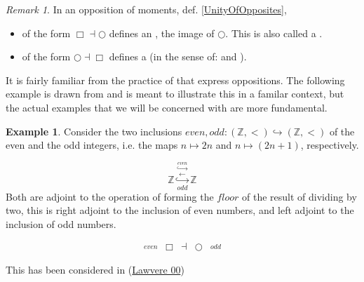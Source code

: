 \documentclass[12pt,titlepage]{article}
\newcommand{\itexarray}[1]{\begin{matrix}#1\end{matrix}}
\newcommand{\lt}{<}
\theoremstyle{plain}
\theoremstyle{definition}
\newtheorem{example}{Example}
\theoremstyle{remark}
\newtheorem{remark}{Remark}
\begin{document}
\begin{remark}
\label{}\hypertarget{}{}
In  an opposition of moments, def. \ref{UnityOfOpposites},

\begin{itemize}%
\item of the form $\Box \dashv \bigcirc$ defines an  , the image of $\bigcirc$. This is also called a \emph{}.


\item of the form $\bigcirc \dashv \Box$ defines a  (in the sense of:  and ).



\end{itemize}
\end{remark}
It is fairly familiar from the practice of  that  express oppositions. The following example is drawn from  and is meant to illustrate this in a familar context, but the actual examples that we will be concerned with are more fundamental.

\begin{example}
\label{}\hypertarget{}{}
Consider the two inclusions $even, odd \colon (\mathbb{Z},\lt ) \hookrightarrow (\mathbb{Z},\lt)$ of the even and the odd integers, i.e. the maps $n \mapsto 2 n$ and $n \mapsto (2n+1)$, respectively.

\begin{displaymath}
\mathbb{Z}
  \stackrel{\overset{even}{\hookrightarrow}}{\stackrel{\longleftarrow}{\underset{odd}{\hookrightarrow}}}
  \mathbb{Z}
\end{displaymath}
Both are adjoint to the operation of forming the $floor$ of the result of dividing by two, this is right adjoint to the inclusion of even numbers, and left adjoint to the inclusion of odd numbers.

\begin{displaymath}
\itexarray{
    \stackrel{even}{} & \Box &\dashv& \bigcirc & \stackrel{odd}{}
  }
\end{displaymath}
\end{example}
This has been considered in (\href{http://ncatlab.org/nlab/show/Aufhebung#Law00}{Lawvere 00})
\end{document}
